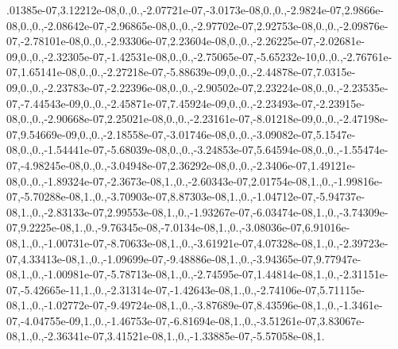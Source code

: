 \begin{DoxyCompactItemize}
.\-01385e-\/07,3.\-12212e-\/08,0.,0.,-\/2.\-07721e-\/07,-\/3.\-0173e-\/08,0.,0.,-\/2.\-9824e-\/07,2.\-9866e-\/08,0.,0.,-\/2.\-08642e-\/07,-\/2.\-96865e-\/08,0.,0.,-\/2.\-97702e-\/07,2.\-92753e-\/08,0.,0.,-\/2.\-09876e-\/07,-\/2.\-78101e-\/08,0.,0.,-\/2.\-93306e-\/07,2.\-23604e-\/08,0.,0.,-\/2.\-26225e-\/07,-\/2.\-02681e-\/09,0.,0.,-\/2.\-32305e-\/07,-\/1.\-42531e-\/08,0.,0.,-\/2.\-75065e-\/07,-\/5.\-65232e-\/10,0.,0.,-\/2.\-76761e-\/07,1.\-65141e-\/08,0.,0.,-\/2.\-27218e-\/07,-\/5.\-88639e-\/09,0.,0.,-\/2.\-44878e-\/07,7.\-0315e-\/09,0.,0.,-\/2.\-23783e-\/07,-\/2.\-22396e-\/08,0.,0.,-\/2.\-90502e-\/07,2.\-23224e-\/08,0.,0.,-\/2.\-23535e-\/07,-\/7.\-44543e-\/09,0.,0.,-\/2.\-45871e-\/07,7.\-45924e-\/09,0.,0.,-\/2.\-23493e-\/07,-\/2.\-23915e-\/08,0.,0.,-\/2.\-90668e-\/07,2.\-25021e-\/08,0.,0.,-\/2.\-23161e-\/07,-\/8.\-01218e-\/09,0.,0.,-\/2.\-47198e-\/07,9.\-54669e-\/09,0.,0.,-\/2.\-18558e-\/07,-\/3.\-01746e-\/08,0.,0.,-\/3.\-09082e-\/07,5.\-1547e-\/08,0.,0.,-\/1.\-54441e-\/07,-\/5.\-68039e-\/08,0.,0.,-\/3.\-24853e-\/07,5.\-64594e-\/08,0.,0.,-\/1.\-55474e-\/07,-\/4.\-98245e-\/08,0.,0.,-\/3.\-04948e-\/07,2.\-36292e-\/08,0.,0.,-\/2.\-3406e-\/07,1.\-49121e-\/08,0.,0.,-\/1.\-89324e-\/07,-\/2.\-3673e-\/08,1.,0.,-\/2.\-60343e-\/07,2.\-01754e-\/08,1.,0.,-\/1.\-99816e-\/07,-\/5.\-70288e-\/08,1.,0.,-\/3.\-70903e-\/07,8.\-87303e-\/08,1.,0.,-\/1.\-04712e-\/07,-\/5.\-94737e-\/08,1.,0.,-\/2.\-83133e-\/07,2.\-99553e-\/08,1.,0.,-\/1.\-93267e-\/07,-\/6.\-03474e-\/08,1.,0.,-\/3.\-74309e-\/07,9.\-2225e-\/08,1.,0.,-\/9.\-76345e-\/08,-\/7.\-0134e-\/08,1.,0.,-\/3.\-08036e-\/07,6.\-91016e-\/08,1.,0.,-\/1.\-00731e-\/07,-\/8.\-70633e-\/08,1.,0.,-\/3.\-61921e-\/07,4.\-07328e-\/08,1.,0.,-\/2.\-39723e-\/07,4.\-33413e-\/08,1.,0.,-\/1.\-09699e-\/07,-\/9.\-48886e-\/08,1.,0.,-\/3.\-94365e-\/07,9.\-77947e-\/08,1.,0.,-\/1.\-00981e-\/07,-\/5.\-78713e-\/08,1.,0.,-\/2.\-74595e-\/07,1.\-44814e-\/08,1.,0.,-\/2.\-31151e-\/07,-\/5.\-42665e-\/11,1.,0.,-\/2.\-31314e-\/07,-\/1.\-42643e-\/08,1.,0.,-\/2.\-74106e-\/07,5.\-71115e-\/08,1.,0.,-\/1.\-02772e-\/07,-\/9.\-49724e-\/08,1.,0.,-\/3.\-87689e-\/07,8.\-43596e-\/08,1.,0.,-\/1.\-3461e-\/07,-\/4.\-04755e-\/09,1.,0.,-\/1.\-46753e-\/07,-\/6.\-81694e-\/08,1.,0.,-\/3.\-51261e-\/07,3.\-83067e-\/08,1.,0.,-\/2.\-36341e-\/07,3.\-41521e-\/08,1.,0.,-\/1.\-33885e-\/07,-\/5.\-57058e-\/08,1.
\end{DoxyCompactItemize}
